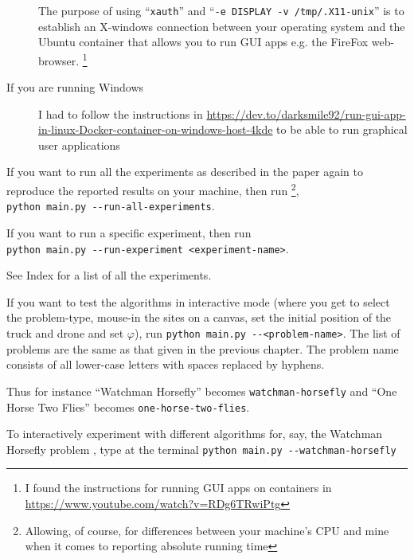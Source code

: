 \documentclass[11.5pt]{report}
\begin{document}
\begin{alphalist}
\begin{description}
The purpose of using  ``\verb|xauth|'' and ``\verb|-e DISPLAY -v /tmp/.X11-unix|'' is to establish an X-windows connection between your operating 
system and the Ubuntu container that allows you to run GUI apps e.g. the FireFox web-browser. 
\footnote{I found the instructions for running GUI apps on containers in \url{https://www.youtube.com/watch?v=RDg6TRwiPtg}}

\item[If you are running Windows] I had to follow the instructions in 
      \url{https://dev.to/darksmile92/run-gui-app-in-linux-Docker-container-on-windows-host-4kde} to be 
      able to run graphical user applications
\end{description}

\item {} If you want to run all the experiments as described in 
  the paper again to reproduce the reported results on your machine, then run \footnote{ Allowing, of course,
  for differences between your machine's CPU and mine when it comes to reporting absolute running time}, \\
  \verb|python main.py --run-all-experiments|. 

  If you want to run a specific experiment, then run \\ \verb|python main.py --run-experiment <experiment-name>|. 

  See Index for a list of all the experiments. 

\item {}  If you want to test the algorithms in interactive mode 
  (where you get to select the problem-type, mouse-in the sites on a canvas, set the initial position of 
  the truck and drone and set $\varphi$), run \verb|python main.py --<problem-name>|. The
  list of problems are the same as that given in the previous chapter. The problem name consists
  of all lower-case letters with spaces replaced by hyphens. 

  Thus for instance ``Watchman Horsefly'' becomes \verb|watchman-horsefly| and ``One Horse Two Flies''
  becomes \verb|one-horse-two-flies|. 

  To interactively experiment with different algorithms for, say, the Watchman Horsefly problem , 
  type at the terminal \verb|python main.py --watchman-horsefly|
\end{alphalist}

\vspace{1cm}
\end{document}
